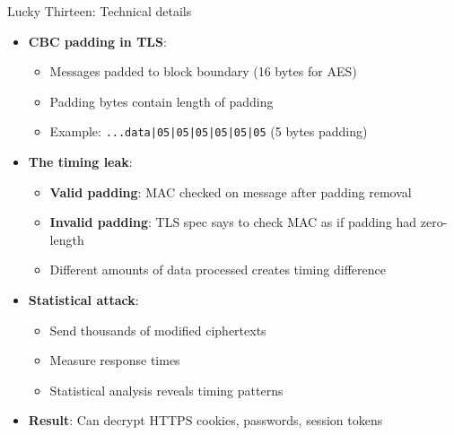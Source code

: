 \documentclass[aspectratio=169, lualatex, handout]{beamer}
\begin{document}
\begin{frame}{Lucky Thirteen: Technical details}
	\begin{itemize}
		\item \textbf{CBC padding in TLS}:
		      \begin{itemize}
			      \item Messages padded to block boundary (16 bytes for AES)
			      \item Padding bytes contain length of padding
			      \item Example: \texttt{...data|05|05|05|05|05|05} (5 bytes padding)
		      \end{itemize}
		\item \textbf{The timing leak}:
		      \begin{itemize}
			      \item \textbf{Valid padding}: MAC checked on message after padding removal
			      \item \textbf{Invalid padding}: TLS spec says to check MAC as if padding had zero-length
			      \item Different amounts of data processed creates timing difference
		      \end{itemize}
		\item \textbf{Statistical attack}:
		      \begin{itemize}
			      \item Send thousands of modified ciphertexts
			      \item Measure response times
			      \item Statistical analysis reveals timing patterns
		      \end{itemize}
		\item \textbf{Result}: Can decrypt HTTPS cookies, passwords, session tokens
	\end{itemize}
\end{frame}
\end{document}
